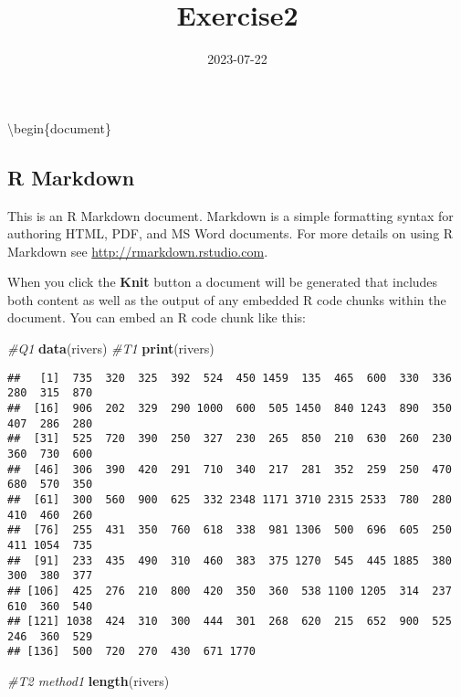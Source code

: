 \documentclass[
]{article}
\title{Exercise2}
\author{}
\date{\vspace{-2.5em}2023-07-22}
\newenvironment{Shaded}{\begin{snugshade}}{\end{snugshade}}
\newcommand{\CommentTok}[1]{\textcolor[rgb]{0.56,0.35,0.01}{\textit{#1}}}
\newcommand{\FunctionTok}[1]{\textcolor[rgb]{0.13,0.29,0.53}{\textbf{#1}}}
\newcommand{\NormalTok}[1]{#1}
\begin{document}
\maketitle

\usepackage{ctex}

\textbackslash begin\{document\}

\hypertarget{r-markdown}{%
\subsection{R Markdown}\label{r-markdown}}

This is an R Markdown document. Markdown is a simple formatting syntax
for authoring HTML, PDF, and MS Word documents. For more details on
using R Markdown see \url{http://rmarkdown.rstudio.com}.

When you click the \textbf{Knit} button a document will be generated
that includes both content as well as the output of any embedded R code
chunks within the document. You can embed an R code chunk like this:

\begin{Shaded}
\begin{Highlighting}[]
\CommentTok{\#Q1}
\FunctionTok{data}\NormalTok{(rivers)}
\CommentTok{\#T1}
\FunctionTok{print}\NormalTok{(rivers)}
\end{Highlighting}
\end{Shaded}

\begin{verbatim}
##   [1]  735  320  325  392  524  450 1459  135  465  600  330  336  280  315  870
##  [16]  906  202  329  290 1000  600  505 1450  840 1243  890  350  407  286  280
##  [31]  525  720  390  250  327  230  265  850  210  630  260  230  360  730  600
##  [46]  306  390  420  291  710  340  217  281  352  259  250  470  680  570  350
##  [61]  300  560  900  625  332 2348 1171 3710 2315 2533  780  280  410  460  260
##  [76]  255  431  350  760  618  338  981 1306  500  696  605  250  411 1054  735
##  [91]  233  435  490  310  460  383  375 1270  545  445 1885  380  300  380  377
## [106]  425  276  210  800  420  350  360  538 1100 1205  314  237  610  360  540
## [121] 1038  424  310  300  444  301  268  620  215  652  900  525  246  360  529
## [136]  500  720  270  430  671 1770
\end{verbatim}

\begin{Shaded}
\begin{Highlighting}[]
\CommentTok{\#T2 method1}
\FunctionTok{length}\NormalTok{(rivers)}
\end{Highlighting}
\end{Shaded}
\end{document}
